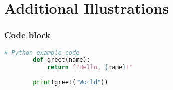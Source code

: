 

\section*{Additional Illustrations}

\begin{frame}[fragile]
	\frametitle{Code block}

	\begin{lstlisting}[language=Python]
		# Python example code
		def greet(name):
			return f"Hello, {name}!"
		
		print(greet("World"))
	\end{lstlisting}
\end{frame}